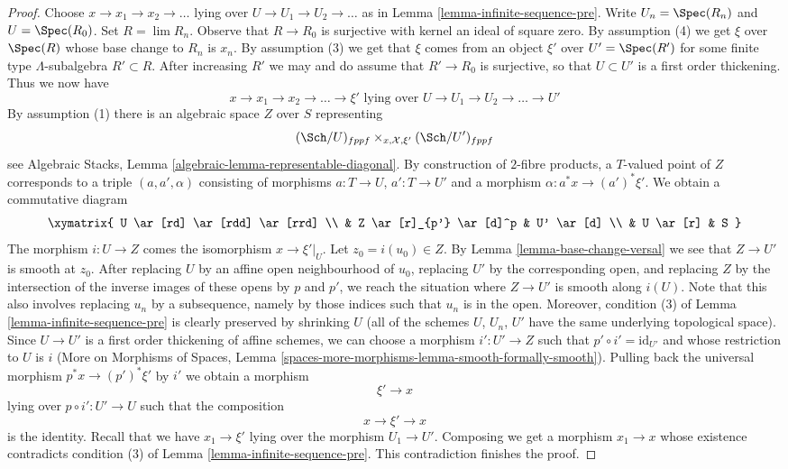 \begin{proof}
\medskip\noindent
Choose $x \to x_1 \to x_2 \to \ldots$ lying over
$U \to U_1 \to U_2 \to \ldots$ as in Lemma \ref{lemma-infinite-sequence-pre}.
Write $U_n = \Spec(R_n)$ and $U = \Spec(R_0)$.
Set $R = \lim R_n$. Observe that $R \to R_0$ is surjective
with kernel an ideal of square zero. By assumption (4)
we get $\xi$ over $\Spec(R)$ whose base change to $R_n$ is $x_n$.
By assumption (3) we get that $\xi$ comes from an object $\xi'$ over
$U' = \Spec(R')$ for some finite type $\Lambda$-subalgebra
$R' \subset R$. After increasing $R'$ we may and do assume that
$R' \to R_0$ is surjective, so that $U \subset U'$ is a first order thickening.
Thus we now have
$$
x \to x_1 \to x_2 \to \ldots \to \xi'
\text{ lying over }
U \to U_1 \to U_2 \to \ldots \to U'
$$
By assumption (1) there is an algebraic space $Z$ over $S$ representing
$$
(\Sch/U)_{fppf} \times_{x, \mathcal{X}, \xi'} (\Sch/U')_{fppf}
$$
see Algebraic Stacks, Lemma \ref{algebraic-lemma-representable-diagonal}.
By construction of $2$-fibre products, a $T$-valued point of $Z$
corresponds to a triple $(a, a', \alpha)$ consisting of morphisms
$a : T \to U$, $a' : T \to U'$ and a morphism $\alpha : a^*x \to (a')^*\xi'$.
We obtain a commutative diagram
$$
\xymatrix{
U \ar[rd] \ar[rdd] \ar[rrd] \\
& Z \ar[r]_{p'} \ar[d]^p & U' \ar[d] \\
& U \ar[r] & S
}
$$
The morphism $i : U \to Z$ comes the isomorphism $x \to \xi'|_U$.
Let $z_0 = i(u_0) \in Z$. By Lemma \ref{lemma-base-change-versal}
we see that $Z \to U'$ is smooth at $z_0$. After replacing $U$ by an
affine open neighbourhood of $u_0$, replacing $U'$ by the corresponding
open, and replacing $Z$ by the intersection of the inverse images
of these opens by $p$ and $p'$, we reach the situation where
$Z \to U'$ is smooth along $i(U)$. Note that this
also involves replacing $u_n$ by a subsequence, namely
by those indices such that $u_n$ is in the open. Moreover, condition
(3) of Lemma \ref{lemma-infinite-sequence-pre}
is clearly preserved by shrinking $U$
(all of the schemes $U$, $U_n$, $U'$ have the same underlying
topological space).
Since $U \to U'$ is a first order thickening of affine schemes,
we can choose a morphism $i' : U' \to Z$
such that $p' \circ i' = \text{id}_{U'}$ and
whose restriction to $U$ is $i$
(More on Morphisms of Spaces, Lemma
\ref{spaces-more-morphisms-lemma-smooth-formally-smooth}).
Pulling back the universal morphism
$p^*x \to (p')^*\xi'$ by $i'$ we obtain a morphism
$$
\xi' \to x
$$
lying over $p \circ i' : U' \to U$ such that the composition
$$
x \to \xi' \to x
$$
is the identity. Recall that we have $x_1 \to \xi'$ lying over
the morphism $U_1 \to U'$. Composing we get a morphism
$x_1 \to x$ whose existence contradicts condition
(3) of Lemma \ref{lemma-infinite-sequence-pre}.
This contradiction finishes the proof.
\end{proof}

